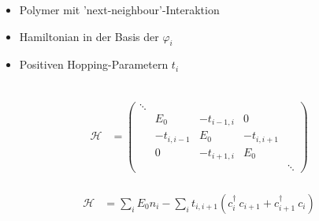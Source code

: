 \begin{frame}
\begin{minipage}{.39\textwidth}
	\begin{itemize}
		\setlength\itemsep{1cm}
		\item Polymer mit 'next-neighbour'-Interaktion
		\item Hamiltonian in der Basis der $\varphi_i$
		\item Positiven Hopping-Parametern $t_i$
	\end{itemize}
\end{minipage}
\begin{minipage}{0.6\textwidth}
\centering
{}
\\
\begin{align*}
\mathcal{H} &= \begin{pmatrix*}
\ddots&&&\\
&E_{0}&-t_{i-1, i}&0\\
&-t_{i, i-1}&E_0&-t_{i, i+1}\\
&0&-t_{i+1, i}&E_{0}&\\
&&&&\ddots
\end{pmatrix*}
\end{align*}
\\
\begin{align*}
	\mathcal{H} &= \sum_i E_0 n_i - \sum_i t_{i, i+1} \left(c_i^\dagger\  c_{i+1} + c_{i+1}^\dagger\  c_i\right)
\end{align*}
\end{minipage}
\end{frame}


